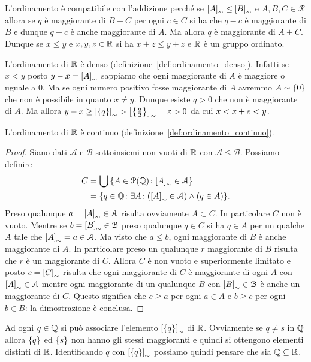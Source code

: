 L'ordinamento è compatibile con l'addizione perché se ${\left[ A \right]}_\sim 
\le {\left[ B \right]}_\sim$ e $A,B,C\in \mathcal R$ 
allora se $q$ è maggiorante di $B+C$ per ogni $c\in C$ si ha che $q-c$ 
è maggiorante di $B$ e dunque $q-c$ è anche maggiorante di $A$.
Ma allora $q$ è maggiorante di $A+C$. Dunque se $x\le y$ e $x,y,z\in {\mathbb R}$ 
si ha $x+z\le y+z$ e ${\mathbb R}$ è un gruppo ordinato.

L'ordinamento di ${\mathbb R}$ è denso (definizione~\ref{def:ordinamento_denso}). 
Infatti se $x<y$ posto $y-x={\left[ A \right]}_\sim$ 
sappiamo che ogni maggiorante di $A$ è maggiore o uguale a $0$.
Ma se ogni numero positivo fosse maggiorante di $A$ avremmo $A\sim{\left\{ 0 \right\}}$
che non è possibile in quanto $x\neq y$. Dunque esiste $q>0$ 
che non è maggiorante di $A$. 
Ma allora $y-x \ge {\left[ {\left\{ q \right\}} \right]}_\sim > {\left[ {\left\{ \frac q 2 \right\}} \right]}_\sim = \varepsilon > 0$
da cui $x<x+\varepsilon<y$.

\begin{theorem}  
L'ordinamento di ${\mathbb R}$ è continuo
(definizione~\ref{def:ordinamento_continuo}).
\end{theorem}
\begin{proof}
Siano dati $\mathcal A$ e $\mathcal B$ sottoinsiemi non vuoti di ${\mathbb R}$ 
con $\mathcal A\le \mathcal B$. 
Possiamo definire
\begin{align*}
  C & = \bigcup{\left\{ A\in \mathcal P({\mathbb Q})\colon {\left[ A \right]}_\sim \in \mathcal A \right\}} \\
    &= {\left\{ q\in {\mathbb Q}\colon \exists A\colon 
    ({\left[ A \right]}_\sim \in \mathcal A) \land (q\in A) \right\}}.
\end{align*}
Preso qualunque $a={\left[ A \right]}_\sim \in \mathcal A$ risulta 
ovviamente $A\subset C$. In particolare $C$ non è vuoto.
Mentre se $b={\left[ B \right]}_\sim \in \mathcal B$ 
preso qualunque $q\in C$ si ha $q\in A$ per un qualche $A$ tale che 
${\left[ A \right]}_\sim = a\in \mathcal A$.
Ma visto che $a\le b$, ogni maggiorante di $B$ è anche maggiorante di $A$.
In particolare preso un qualunque $r$ maggiorante di $B$
risulta che $r$ è un maggiorante di $C$.
Allora $C$ è non vuoto e superiormente limitato 
e posto $c={\left[ C \right]}_\sim$ 
risulta che ogni maggiorante di $C$ è maggiorante di 
ogni $A$ con ${\left[ A \right]}_\sim \in \mathcal A$ mentre 
ogni maggiorante di un qualunque $B$ con ${\left[ B \right]}_\sim\in \mathcal B$ 
è anche un maggiorante di $C$.
Questo significa che $c\ge a$ per ogni $a\in A$ 
e $b\ge c$ per ogni $b\in B$: la dimostrazione è conclusa.
\end{proof}

Ad ogni $q\in {\mathbb Q}$ si può associare l'elemento ${\left[ {\left\{ q \right\}} \right]}_\sim$ 
di ${\mathbb R}$. Ovviamente se $q\neq s$ in ${\mathbb Q}$ allora ${\left\{ q \right\}}$ 
ed ${\left\{ s \right\}}$ non hanno gli stessi maggioranti e quindi si ottengono 
elementi distinti di ${\mathbb R}$. Identificando $q$ con ${\left[ {\left\{ q \right\}} \right]}_\sim$ 
possiamo quindi pensare che sia ${\mathbb Q} \subseteq {\mathbb R}$.

